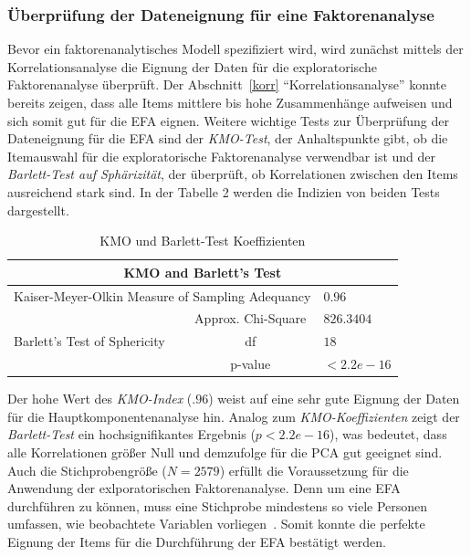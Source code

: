 \documentclass[12pt,a4paper]{article}
\begin{document}
\subsubsection{Überprüfung der Dateneignung für eine Faktorenanalyse} 

Bevor ein faktorenanalytisches Modell spezifiziert wird, wird zunächst mittels der Korrelationsanalyse die Eignung der Daten für die exploratorische Faktorenanalyse überprüft. Der Abschnitt~\ref{korr} "`Korrelationsanalyse"' konnte bereits zeigen, dass alle Items mittlere bis hohe Zusammenhänge aufweisen und sich somit gut für die EFA eignen. Weitere wichtige Tests zur Überprüfung der Dateneignung für die EFA sind der \textit{KMO-Test}, der Anhaltspunkte gibt, ob die Itemauswahl für die exploratorische Faktorenanalyse verwendbar ist und der \textit{Barlett-Test auf Sphärizität}, der überprüft, ob Korrelationen zwischen den Items ausreichend stark sind. In der Tabelle 2 werden die Indizien von beiden Tests dargestellt.


\begin{table}
\centering
\caption{KMO und Barlett-Test Koeffizienten}
\label{tab_KMO}
\begin{tabular}{lcl}
\hline 
\multicolumn{3}{c}{KMO and Barlett's Test} \\ 
\hline 
\multicolumn{2}{l}{Kaiser-Meyer-Olkin Measure of Sampling Adequancy } &   $0.96$ \\ 

&      Approx. Chi-Square                  &  $826.3404$ \\ 

Barlett's Test of Sphericity  &   df  & $18$ \\ 

  &   p-value                         &  $< 2.2e-16 $ \\ 
\hline 
\end{tabular} 

\end{table}

Der hohe Wert des \textit{KMO-Index} ($.96$) weist auf eine sehr gute Eignung der Daten für die Hauptkomponentenanalyse hin. Analog zum \textit{KMO-Koeffizienten} zeigt der \textit{Barlett-Test} ein hochsignifikantes Ergebnis ($p < 2.2e-16$), was bedeutet, dass alle Korrelationen größer Null und demzufolge für die PCA gut geeignet sind. Auch die Stichprobengröße ($N = 2579$) erfüllt die Voraussetzung für die Anwendung der exlporatorischen Faktorenanalyse. Denn um eine EFA durchführen zu können, muss eine Stichprobe mindestens so viele Personen umfassen, wie beobachtete Variablen vorliegen~\parencite[S.~918]{Eid_2013}. Somit konnte die perfekte Eignung der Items für die Durchführung der EFA bestätigt werden.
\end{document}
